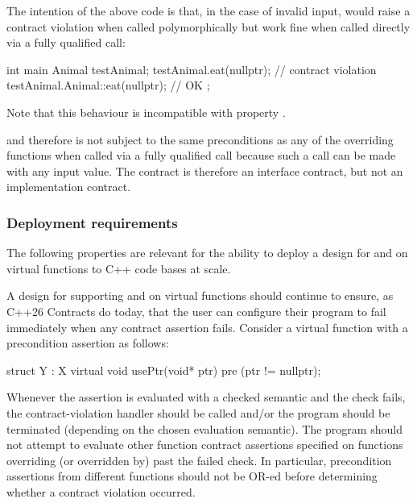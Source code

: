 The intention of the above code is that, in the case of invalid input,  would raise a contract violation when called polymorphically but work fine when called directly via a fully qualified call:
\begin{codeblock}
int main {
  Animal testAnimal;
  testAnimal.eat(nullptr);  // contract violation
  testAnimal.Animal::eat(nullptr); // OK
};
\end{codeblock}

Note that this behaviour is incompatible with property .

 and therefore is not subject to the same
preconditions as any of the overriding functions when called via a fully qualified call because such a
call can be made with any input value. The contract is therefore an interface contract, but not an
implementation contract.


\subsubsection{Deployment requirements}

The following properties are relevant for the ability to deploy a design for  and  on virtual functions to C++ code bases at scale.


A design for supporting  and  on virtual functions should continue to ensure, as C++26 Contracts do today, that the user can configure their program to fail immediately when any contract assertion fails. Consider a virtual function with a precondition assertion as follows:
\begin{codeblock}
struct Y : X {
  virtual void usePtr(void* ptr) 
    pre (ptr != nullptr);
}
\end{codeblock}
Whenever the assertion \mbox{} is evaluated with a checked semantic and the check fails, the contract-violation handler should be called and/or the program should be terminated (depending on the chosen evaluation semantic). The program should not attempt to evaluate other function contract assertions specified on functions overriding (or overridden by)  past the failed check. In particular, precondition assertions from different functions should not be OR-ed before determining whether a contract violation occurred.

